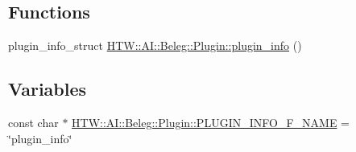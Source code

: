 \subsection*{Functions}
\begin{DoxyCompactItemize}
\item 
plugin\-\_\-info\-\_\-struct \hyperlink{namespace_h_t_w_1_1_a_i_1_1_beleg_1_1_plugin_a09f048dbac5b6f35fca9900b50aa9224}{H\-T\-W\-::\-A\-I\-::\-Beleg\-::\-Plugin\-::plugin\-\_\-info} ()
\end{DoxyCompactItemize}
\subsection*{Variables}
\begin{DoxyCompactItemize}
\item 
const char $\ast$ \hyperlink{namespace_h_t_w_1_1_a_i_1_1_beleg_1_1_plugin_ae1feecb2d4486345d2cb0ce3bed02d63}{H\-T\-W\-::\-A\-I\-::\-Beleg\-::\-Plugin\-::\-P\-L\-U\-G\-I\-N\-\_\-\-I\-N\-F\-O\-\_\-\-F\-\_\-\-N\-A\-M\-E} = \char`\"{}plugin\-\_\-info\char`\"{}
\end{DoxyCompactItemize}
